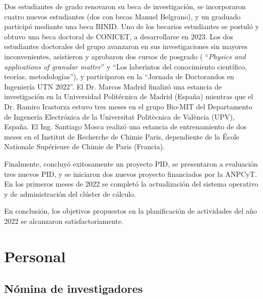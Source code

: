 \documentclass[a4paper,11pt,twoside,final,titlepage,onecolumn,openright]{report}
\begin{document}
Dos estudiantes de grado renovaron su beca de investigación, se incorporaron cuatro nuevos estudiantes (dos con becas Manuel Belgrano), y un graduado participó mediante una beca BINID. Uno de los becarios estudiantes se postuló y obtuvo una beca doctoral de CONICET, a desarrollarse en 2023. Los dos estudiantes doctorales del grupo avanzaron en sus investigaciones sin mayores inconvenientes, asistieron y aprobaron dos cursos de posgrado ( ``\textit{Physics and applications of granular matter}'' y ``Los laberintos del conocimiento científico, teorías, metodologías''), y participaron en la ``Jornada de Doctorandos en Ingeniería UTN 2022''.  El Dr. Marcos Madrid finalizó una estancia de investigación en la Universidad Politécnica de Madrid (España) mientras que el Dr. Ramiro Irastorza estuvo tres meses en el grupo Bio-MIT del Departamento de Ingenería Electrónica de la Universitat Politècnica de València (UPV), España. El Ing. Santiago Mosca realizó una estancia de entrenamiento de dos meses en el Institut de Recherche de Chimie Paris, dependiente de la École Nationale Supérieure de Chimie de Paris (Francia).

Finalmente, concluyó exitosamente un proyecto PID, se presentaron a evaluación tres nuevos PID,  y se iniciaron dos nuevos proyecto financiados por la ANPCyT. En los primeros meses de 2022 se completó la actualización del sistema operativo y de administración del clúster de cálculo.

En conclusión, los objetivos propuestos en la planificación de actividades del año 2022 se alcanzaron satisfactoriamente.

\section{Personal}

\subsection{Nómina de investigadores}
\end{document}
